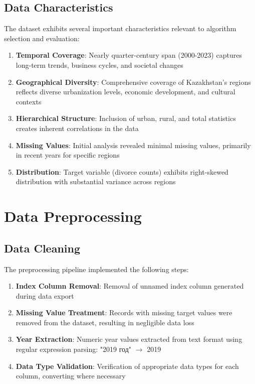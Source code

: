 \subsection{Data Characteristics}

The dataset exhibits several important characteristics relevant to algorithm selection and evaluation:

\begin{enumerate}
    \item \textbf{Temporal Coverage}: Nearly quarter-century span (2000-2023) captures long-term trends, business cycles, and societal changes
    \item \textbf{Geographical Diversity}: Comprehensive coverage of Kazakhstan's regions reflects diverse urbanization levels, economic development, and cultural contexts
    \item \textbf{Hierarchical Structure}: Inclusion of urban, rural, and total statistics creates inherent correlations in the data
    \item \textbf{Missing Values}: Initial analysis revealed minimal missing values, primarily in recent years for specific regions
    \item \textbf{Distribution}: Target variable (divorce counts) exhibits right-skewed distribution with substantial variance across regions
\end{enumerate}

\section{Data Preprocessing}

\subsection{Data Cleaning}

The preprocessing pipeline implemented the following steps:

\begin{enumerate}
    \item \textbf{Index Column Removal}: Removal of unnamed index column generated during data export
    \item \textbf{Missing Value Treatment}: Records with missing target values were removed from the dataset, resulting in negligible data loss
    \item \textbf{Year Extraction}: Numeric year values extracted from text format using regular expression parsing: "2019 год" $\rightarrow$ 2019
    \item \textbf{Data Type Validation}: Verification of appropriate data types for each column, converting where necessary
\end{enumerate}

